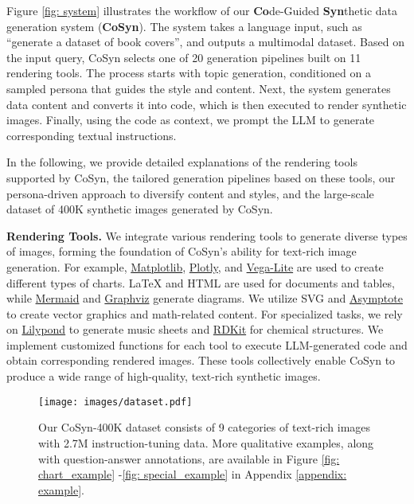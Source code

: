 Figure \ref{fig: system} illustrates the workflow of our \textbf{Co}de-Guided \textbf{Syn}thetic data generation system (\textbf{CoSyn}). 
The system takes a language input, such as ``generate a dataset of book covers'', and outputs a multimodal dataset. 
Based on the input query, CoSyn selects one of 20 generation pipelines built on 11 rendering tools.
The process starts with topic generation, conditioned on a sampled persona that guides the style and content. 
Next, the system generates data content and converts it into code, which is then executed to render synthetic images. 
Finally, using the code as context, we prompt the LLM to generate corresponding textual instructions.

In the following, we provide detailed explanations of the rendering tools supported by CoSyn, the tailored generation pipelines based on these tools, our persona-driven approach to diversify content and styles, and the large-scale dataset of 400K synthetic images generated by CoSyn. 

\smallbreak
\noindent \textbf{Rendering Tools.} We integrate various rendering tools to generate diverse types of images, forming the foundation of CoSyn’s ability for text-rich image generation. 
For example, \href{https://matplotlib.org/}{Matplotlib}, \href{https://plotly.com/}{Plotly}, and \href{https://vega.github.io/vega-lite/}{Vega-Lite} are used to create different types of charts.
LaTeX and HTML are used for documents and tables, while \href{https://mermaid.js.org/}{Mermaid} and \href{https://graphviz.org/}{Graphviz} generate diagrams.
We utilize SVG and \href{https://asymptote.sourceforge.io/}{Asymptote} to create vector graphics and math-related content. 
For specialized tasks, we rely on \href{http://lilypond.org/}{Lilypond} to generate music sheets and \href{https://www.rdkit.org/}{RDKit} for chemical structures.
We implement customized functions for each tool to execute LLM-generated code and obtain corresponding rendered images. 
These tools collectively enable CoSyn to produce a wide range of high-quality, text-rich synthetic images.
\begin{figure*}[!t]
    \centering
    \texttt{[image: images/dataset.pdf]}
    \vspace{-.6cm}
    \caption{Our CoSyn-400K dataset consists of 9 categories of text-rich images with 2.7M instruction-tuning data. More qualitative examples, along with question-answer annotations, are available in Figure \ref{fig: chart_example} -\ref{fig: special_example} in Appendix \ref{appendix: example}.}
    \label{fig: dataset}
    \vspace{-.3cm}
\end{figure*}

